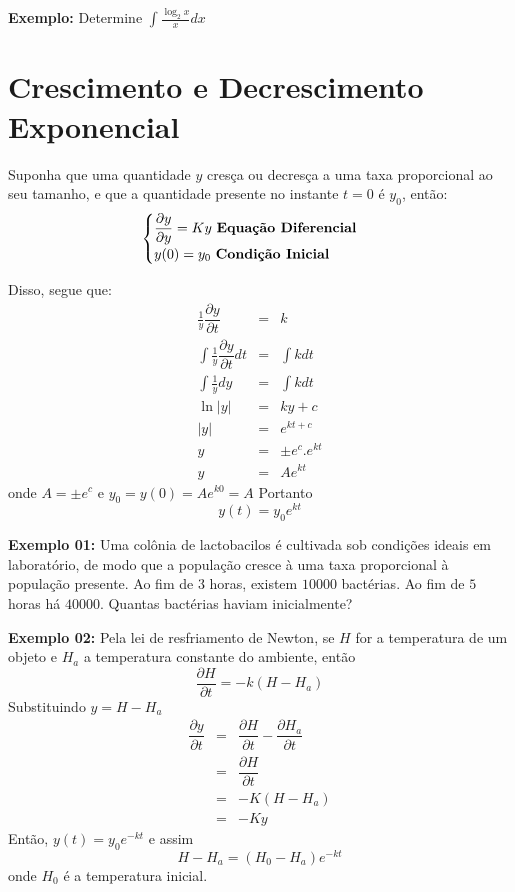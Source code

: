 \documentclass[oneside,a4paper,12pt]{article}
\begin{document}
{\bf Exemplo: } Determine $\int\frac{\log_{2}x}{x}dx$

\vspace{300pt}

\section{Crescimento e Decrescimento Exponencial}

Suponha que uma quantidade $y$ cresça ou decresça a uma taxa proporcional ao seu tamanho, e que a quantidade presente no instante $t = 0$ é $y_0$, então:
$$\begin{cases}
\dfrac{\partial y}{\partial y} = Ky \text{ {\bf Equação Diferencial }} \\
y(0) = y_0 \text{ {\bf Condição Inicial }}
\end{cases}
$$

Disso, segue que:
\begin{eqnarray*}
\frac{1}{y}\dfrac{\partial y}{\partial t} & = & k \\
\int \frac{1}{y}\dfrac{\partial y}{\partial t}dt & = & \int kdt \\
\int \frac{1}{y}dy & = & \int kdt \\
\ln|y| & = & ky + c \\
|y|& = & e^{kt + c} \\
y & = & \pm e^c . e^{kt} \\
y & = & Ae^{kt} 
\end{eqnarray*}
onde $A = \pm e^c$ e $y_0 = y(0) = Ae^{k0} = A$
Portanto
$$y(t) = y_0 e^{kt}$$

\newpage
{\bf Exemplo 01: } Uma colônia de lactobacilos é cultivada sob condições ideais em laboratório, de modo que a população cresce à uma taxa proporcional à população presente. Ao fim de $3$ horas, existem $10000$ bactérias. Ao fim de $5$ horas há $40000$. Quantas bactérias haviam inicialmente?
\newpage

{\bf Exemplo 02: } Pela lei de resfriamento de Newton, se $H$ for a temperatura de um objeto e $H_a$ a temperatura constante do ambiente, então
$$\dfrac{\partial H}{\partial t} = -k(H - H_a)$$
Substituindo $y = H - H_a$
\begin{eqnarray*}
\dfrac{\partial y}{\partial t} & = & \dfrac{\partial H}{\partial t} - \dfrac{\partial H_a}{\partial t} \\
& = & \dfrac{\partial H}{\partial t} \\
& = & -K(H - H_a) \\
& = & -Ky
\end{eqnarray*}
Então, $y(t) = y_0 e^{-kt}$ e assim
$$H - H_a = (H_0 - H_a)e^{-kt}$$
onde $H_0$ é a temperatura inicial.
\end{document}
